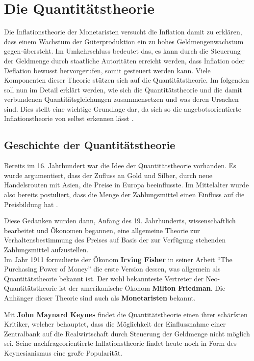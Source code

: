 \chapter{Die Quantitätstheorie}

Die Inflationstheorie der Monetaristen versucht die Inflation damit zu erklären, dass einem Wachstum der Güterproduktion ein zu hohes Geldmengenwachstum gegen-übersteht. Im Umkehrschluss bedeutet das, es kann durch die Steuerung der Geldmenge durch staatliche Autoritäten erreicht werden, dass Inflation oder Deflation bewusst hervorgerufen, somit gesteuert werden kann. Viele Komponenten dieser Theorie stützen sich auf die Quantitätstheorie. Im folgenden soll nun im Detail erklärt werden, wie sich die Quantitätstheorie und die damit verbundenen Quantitätsgleichungen zusammensetzen und was deren Ursachen sind. Dies stellt eine wichtige Grundlage dar, da sich so die angebotsorientierte Inflationstheorie von selbst erkennen lässt \autocite{brunner1970}.

\section{Geschichte der Quantitätstheorie}
Bereits im 16. Jahrhundert war die Idee der Quantitätstheorie vorhanden. Es wurde argumentiert, dass der Zufluss an Gold und Silber, durch neue Handelsrouten mit Asien, die Preise in Europa beeinflusste. Im Mittelalter wurde also bereits postuliert, dass die Menge der Zahlungsmittel einen Einfluss auf die Preisbildung hat \autocite{Woll1977}.

Diese Gedanken wurden dann, Anfang des 19. Jahrhunderts, wissenschaftlich bearbeitet und Ökonomen begannen, eine allgemeine Theorie zur Verhaltensbestimmung des Preises auf Basis der zur Verfügung stehenden Zahlungsmittel aufzustellen.\\
Im Jahr 1911 formulierte der Ökonom \textbf{Irving Fisher} in seiner Arbeit \enquote{The Purchasing Power of Money} die erste Version dessen, was allgemein als Quantitätstheorie bekannt ist. Der wohl bekannteste Vertreter der Neo-Quantitätstheorie ist der amerikanische Ökonom \textbf{Milton Friedman}. Die Anhänger dieser Theorie sind auch als \textbf{Monetaristen} bekannt.

Mit \textbf{John Maynard Keynes} findet die Quantitätstheorie einen ihrer schärfsten Kritiker, welcher behauptet, dass die Möglichkeit der Einflussnahme einer Zentralbank auf die Realwirtschaft durch Steuerung der Geldmenge nicht möglich sei. Seine nachfrageorientierte Inflationstheorie findet heute noch in Form des Keynesianismus eine große Popularität.

